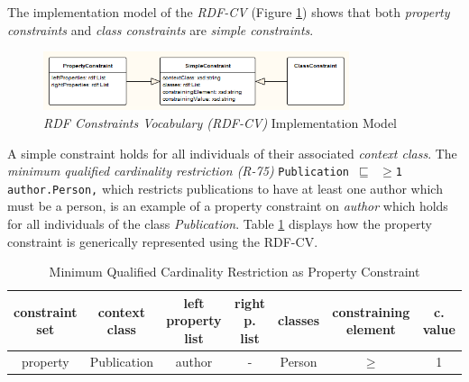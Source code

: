 \documentclass[a4paper,fontsize=11pt]{scrartcl}
\newcommand{\ms}[1]{\texttt{#1}}
\begin{document}
The implementation model of the \emph{RDF-CV} (Figure \ref{fig:RDF-CV-implementation-model}) shows that
both \emph{property constraints} and \emph{class constraints} are \emph{simple constraints}. 
\begin{figure}[H]
	\centering
		\includegraphics[width=0.80\textwidth]{images/RDF-CV-implementation-model.png}
	\caption{\emph{RDF Constraints Vocabulary (RDF-CV)} Implementation Model}
	\label{fig:RDF-CV-implementation-model}
\end{figure}
A simple constraint holds for all individuals of their associated \emph{context class}.
The \emph{minimum qualified cardinality restriction (R-75)} {\small\ms{Publication $\sqsubseteq$ $\geq$1 author.Person,}}
which restricts publications to have at least one author which must be a person,
is an example of a property constraint on \emph{author}
which holds for all individuals of the class \emph{Publication}.
Table \ref{tab:property-constraint-cardinality-restriction} displays how the property constraint is generically represented using the RDF-CV.
\begin{table}[H]
  \scriptsize
  \sffamily
  \vspace{0cm}
	\caption{Minimum Qualified Cardinality Restriction as Property Constraint}
	\label{tab:property-constraint-cardinality-restriction}
	\centering
		\begin{tabular}{c|c|c|c|c|c|c}
      \textbf{constraint set} & \textbf{context class} & \textbf{left property list} & \textbf{right p. list} & \textbf{classes} & \textbf{constraining element} & \textbf{c. value} \\
      \hline
      property & Publication & author & - & Person & $\geq$ & 1 \\
		\end{tabular}
\end{table}

\end{document}

